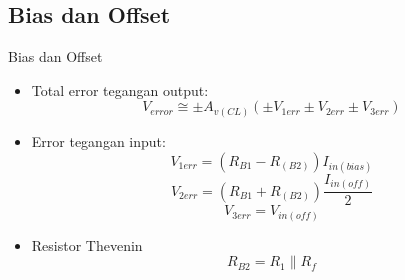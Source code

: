 \subsection{Bias dan Offset}
\begin{frame}{Bias dan Offset}
	\begin{itemize}
		\item Total error tegangan output:
		\begin{equation}\label{pers.16.7}
			V_{error} \cong \pm A_{v(CL)} (\pm V_{1err} \pm V_{2err} \pm V_{3err} )
		\end{equation}
		\item Error tegangan input:
		\begin{equation}\label{pers.16.8}
			V_{1err} = (R_{B1} - R_{(B2)}) I_{in(bias)}
		\end{equation}
		\begin{equation}\label{pers.16.9}
			V_{2err} = (R_{B1} + R_{(B2)}) \frac{I_{in(off)}}{2}
		\end{equation}
		\begin{equation}\label{pers.16.10}
			V_{3err} = V_{in(off)}
		\end{equation}
		\item Resistor Thevenin
		\begin{equation}\label{pers.16.11}
			R_{B2} = R_1 \parallel R_f
		\end{equation}
	\end{itemize}
\end{frame}

